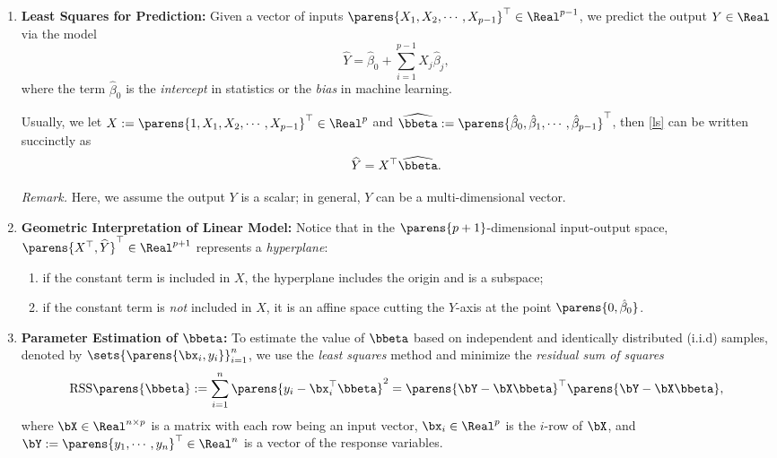\documentclass[12pt]{article}
\begin{document}
\begin{enumerate}[label=\textbf{\arabic*.}]

	\item \textbf{Least Squares for Prediction:} Given a vector of inputs $\parens{X_1, X_2, \cdots, X_{p-1}}^\top \in \Real^{p-1}$, we predict the output $Y \in \Real$ via the model 
	\begin{equation}\label{ls}
		\widehat{Y} = \hat{\beta}_0 + \sum_{i=1}^{p-1} X_j \hat{\beta}_j, 
	\end{equation}
	where the term $\hat{\beta}_0$ is the \textit{intercept} in statistics or the \textit{bias} in machine learning. 
	
	Usually, we let $X := \parens{1, X_1, X_2, \cdots, X_{p-1}}^\top \in \Real^{p}$ and $\widehat{\bbeta} := \parens{\hat{\beta}_0, \hat{\beta}_1, \cdots, \hat{\beta}_{p-1}}^\top$, then \eqref{ls} can be written succinctly as 
	\begin{equation}
		\widehat{Y} = X^\top \widehat{\bbeta}. 
	\end{equation}
	
	\textit{Remark.} Here, we assume the output $Y$ is a scalar; in general, $Y$ can be a multi-dimensional vector. 
	
	\item \textbf{Geometric Interpretation of Linear Model:} Notice that in the $\parens{p + 1}$-dimensional input-output space, $\parens{X^\top, \widehat{Y}}^{\top} \in \Real^{p+1}$ represents a \emph{hyperplane}: 
	\begin{enumerate}
		\item if the constant term is included in $X$, the hyperplane includes the origin and is a subspace; 
		\item if the constant term is \emph{not} included in $X$, it is an affine space cutting the $Y$-axis at the point $\parens{0, \hat{\beta}_0}$. 
	\end{enumerate}
	
	\item \textbf{Parameter Estimation of $\bbeta$:} To estimate the value of $\bbeta$ based on independent and identically distributed (i.i.d) samples, denoted by $\sets{\parens{\bx_i, y_i}}_{i=1}^n$, we use the \emph{least squares} method and minimize the \emph{residual sum of squares} 
	\begin{equation}\label{mat-form}
		\mathrm{RSS} \parens{\bbeta} := \sum_{i=1}^n \parens{y_i - \bx_i^\top \bbeta}^2 = \parens{\bY - \bX \bbeta}^\top \parens{\bY - \bX \bbeta}, 
	\end{equation}
	where $\bX \in \Real^{n \times p}$ is a matrix with each row being an input vector, $\bx_i \in \Real^p$ is the $i$-row of $\bX$, and $\bY := \parens{y_1, \cdots, y_n}^\top \in \Real^n$ is a vector of the response variables. 
	

\end{enumerate}
\end{document}
